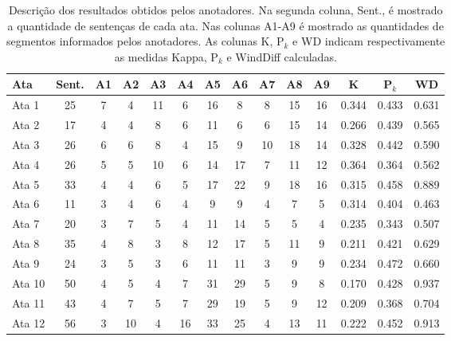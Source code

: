 \begin{table}[!h]
	\centering
	\begin{tabular}{|l|c|c|c|c|c|c|c|c|c|c|c|c|c|} \hline
		\textbf{Ata} & \textbf{Sent.}  & 
		\textbf{A1}  & 
		\textbf{A2}  & 
		\textbf{A3}  & 
		\textbf{A4}  & 
		\textbf{A5}  & 
		\textbf{A6}  & 
		\textbf{A7}  & 
		\textbf{A8}  & 
		\textbf{A9}  &
		\textbf{K}  &
		\textbf{P$_k$}  &
		\textbf{WD}  \\	\hline

		Ata 1  & 25 & 7  & 4  & 11 & 6  & 16 & 8  & 8  & 15 & 16 &  0.344  & 0.433 & 0.631 \\ \hline 
		Ata 2  & 17 & 4  & 4  & 8  & 6  & 11 & 6  & 6  & 15 & 14 &  0.266  & 0.439 & 0.565 \\ \hline 
		Ata 3  & 26 & 6  & 6  & 8  & 4  & 15 & 9  & 10 & 18 & 14 &  0.328  & 0.442 & 0.590 \\ \hline 
		Ata 4  & 26 & 5  & 5  & 10 & 6  & 14 & 17 & 7  & 11 & 12 &  0.364  & 0.364 & 0.562 \\ \hline 
		Ata 5  & 33 & 4  & 4  & 6  & 5  & 17 & 22 & 9  & 18 & 16 &  0.315  & 0.458 & 0.889 \\ \hline 
		Ata 6  & 11 & 3  & 4  & 6  & 4  & 9  & 9  & 4  & 7  &  5 &  0.314  & 0.404 & 0.463 \\ \hline 
		Ata 7  & 20 & 3  & 7  & 5  & 4  & 11 & 14 & 5  & 5  &  4 &  0.235  & 0.343 & 0.507 \\ \hline 
		Ata 8  & 35 & 4  & 8  & 3  & 8  & 12 & 17 & 5  & 11 &  9 &  0.211  & 0.421 & 0.629 \\ \hline 
		Ata 9  & 24 & 3  & 5  & 3  & 6  & 11 & 11 & 3  & 9  &  9 &  0.234  & 0.472 & 0.660 \\ \hline 
		Ata 10 & 50 & 4  & 5  & 4  & 7  & 31 & 29 & 5  & 9  &  8 &  0.170  & 0.428 & 0.937 \\ \hline 
		Ata 11 & 43 & 4  & 7  & 5  & 7  & 29 & 19 & 5  & 9  & 12 &  0.209  & 0.368 & 0.704 \\ \hline 
		Ata 12 & 56 & 3  & 10 & 4  & 16 & 33 & 25 & 4  & 13 & 11 &  0.222  & 0.452 & 0.913 \\ \hline 

	\end{tabular}
	\caption{Descrição dos resultados obtidos pelos anotadores. Na segunda coluna, Sent., é mostrado a quantidade de sentenças de cada ata. Nas colunas A1-A9 é mostrado as quantidades de segmentos informados pelos anotadores. As colunas K, P$_k$ e WD indicam respectivamente as medidas Kappa, P$_k$ e WindDiff calculadas.}
	\label{tab:segmentacaoreferencia}
\end{table}




